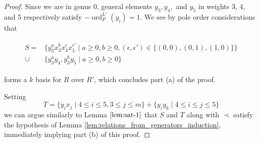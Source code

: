 \documentclass{amsart}
\theoremstyle{plain}
\theoremstyle{definition}
\theoremstyle{remark}
\numberwithin{equation}{section}
\DeclareMathOperator{\ord}{ord}
\newcommand \halfcan{L}
\begin{document}
\begin{proof}
Since we are in genus 0, general
elements $y_3, y_4,$ and $y_5$ in weights 3, 4, and 5 respectively satisfy $- \ord_P^{\halfcan'}(y_i) =
1$.   We see by pole order considerations that

\begin{align}
\label{eqn:add_one_generator}
	\begin{split}
	S=	&\{ y_3^ax_3^b x_4^\epsilon x_5^{\epsilon'} \mid a \geq 0, b 
		\geq 0,(\epsilon,\epsilon') \in \{(0,0),(0,1),(1,0)\} \} \\
	\cup \;&\{y_3^ay_4, y_3^by_5 \mid a \geq 0, b \geq 0 \}
	\end{split}
\end{align}

\noindent forms a $k$ basis for $R$ over $R'$, which concludes part (a) of the proof.

Setting
\[
	T = \{ y_i x_j \mid 4 \leq i \leq 5, 3 \leq j \leq m\}+ \{ y_i y_k \mid 4 \leq i \leq j \leq 5\} 
\]
we can argue similarly to Lemma $\ref{lem:sat-1}$ that $S$ and $T$ along with $\prec$ satisfy the hypothesis of Lemma \ref{lem:relations_from_generators_induction}, immediately implying part (b) of this proof.



%
%
%
%
%
%


\end{proof}
\end{document}
